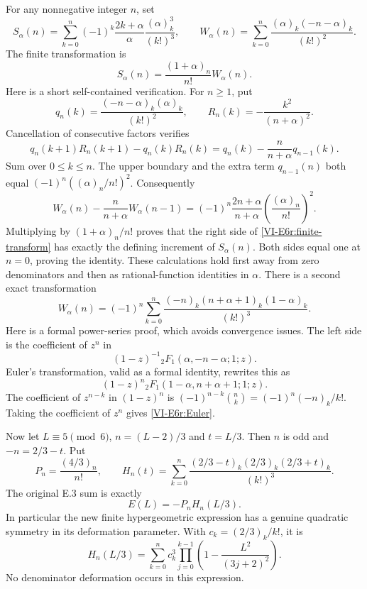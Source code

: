 \documentclass[11pt,letterpaper]{article}
\numberwithin{equation}{section}
\begin{document}
For any nonnegative integer $n$, set
\[
 S_\alpha(n)=\sum_{k=0}^n(-1)^k\frac{2k+\alpha}{\alpha}
 \frac{(\alpha)_k^3}{(k!)^3},\qquad
 W_\alpha(n)=\sum_{k=0}^n\frac{(\alpha)_k(-n-\alpha)_k}{(k!)^2}.
\]
The finite transformation is
\begin{equation}\label{VI-E6r:finite-transform}
 S_\alpha(n)=\frac{(1+\alpha)_n}{n!}W_\alpha(n).
\end{equation}
Here is a short self-contained verification. For $n\ge1$, put
\[
 q_n(k)=\frac{(-n-\alpha)_k(\alpha)_k}{(k!)^2},\qquad
 R_n(k)=-\frac{k^2}{(n+\alpha)^2}.
\]
Cancellation of consecutive factors verifies
\[
 q_n(k+1)R_n(k+1)-q_n(k)R_n(k)
 =q_n(k)-\frac{n}{n+\alpha}q_{n-1}(k).
\]
Sum over $0\le k\le n$. The upper boundary and the extra term
$q_{n-1}(n)$ both equal $(-1)^n((\alpha)_n/n!)^2$.
Consequently
\[
 W_\alpha(n)-\frac{n}{n+\alpha}W_\alpha(n-1)
 =(-1)^n\frac{2n+\alpha}{n+\alpha}
 \left(\frac{(\alpha)_n}{n!}\right)^2.
\]
Multiplying by $(1+\alpha)_n/n!$ proves that the right side of
\eqref{VI-E6r:finite-transform} has exactly the defining increment of
$S_\alpha(n)$. Both sides equal one at $n=0$, proving the identity.
These calculations hold first away from zero denominators and then
as rational-function identities in $\alpha$.
There is a second exact transformation
\begin{equation}\label{VI-E6r:Euler}
 W_\alpha(n)=(-1)^n\sum_{k=0}^n
 \frac{(-n)_k(n+\alpha+1)_k(1-\alpha)_k}{(k!)^3}.
\end{equation}
Here is a formal power-series proof, which avoids convergence issues.
The left side is the coefficient of $z^n$ in
\[
 (1-z)^{-1}{}_2F_1(\alpha,-n-\alpha;1;z).
\]
Euler's transformation, valid as a formal identity, rewrites this as
\[
 (1-z)^n{}_2F_1(1-\alpha,n+\alpha+1;1;z).
\]
The coefficient of $z^{n-k}$ in $(1-z)^n$ is
$(-1)^{n-k}\binom nk=(-1)^n(-n)_k/k!$.
Taking the coefficient of $z^n$ gives \eqref{VI-E6r:Euler}.

Now let $L\equiv5\pmod6$, $n=(L-2)/3$ and $t=L/3$.
Then $n$ is odd and $-n=2/3-t$. Put
\[
 P_n=\frac{(4/3)_n}{n!},\qquad
 H_n(t)=\sum_{k=0}^n
 \frac{(2/3-t)_k(2/3)_k(2/3+t)_k}{(k!)^3}.
\]
The original E.3 sum is exactly
\begin{equation}\label{VI-E6r:symmetric}
 \boxed{\quad E(L)=-P_nH_n(L/3).\quad}
\end{equation}
In particular the new finite hypergeometric expression has a genuine
quadratic symmetry in its deformation parameter. With
$c_k=(2/3)_k/k!$, it is
\begin{equation}\label{VI-E6r:quadratic}
 H_n(L/3)=\sum_{k=0}^n c_k^3
 \prod_{j=0}^{k-1}\left(1-\frac{L^2}{(3j+2)^2}\right).
\end{equation}
No denominator deformation occurs in this expression.
\end{document}

